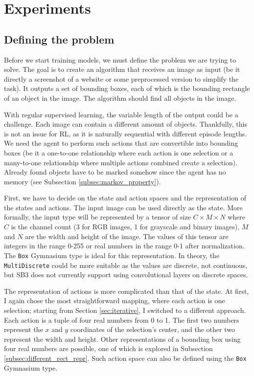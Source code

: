 \documentclass[
  digital,     %
  oneside,     %
  nosansbold,  %
  nocolorbold, %
  lof,         %
  lot,         %
]{fithesis4}
\begin{document}
\chapter{Experiments}
\label{ch:experiments}

\section{Defining the problem}
\label{sec:problem_definition}

Before we start training models, we must define the problem we are trying to solve. The goal is to create an algorithm that receives an image as input (be it directly a screenshot of a website or some preprocessed version to simplify the task). It outputs a set of bounding boxes, each of which is the bounding rectangle of an object in the image. The algorithm should find all objects in the image.

With regular supervised learning, the variable length of the output could be a challenge. Each image can contain a different amount of objects. Thankfully, this is not an issue for RL, as it is naturally sequential with different episode lengths. We need the agent to perform such actions that are convertible into bounding boxes (be it a one-to-one relationship where each action is one selection or a many-to-one relationship where multiple actions combined create a selection). Already found objects have to be marked somehow since the agent has no memory (see Subsection \ref{subsec:markov_property}).

First, we have to decide on the state and action spaces and the representation of the states and actions. The input image can be used directly as the state. More formally, the input type will be represented by a tensor of size $C\times M \times N$ where $C$ is the channel count (3 for RGB images, 1 for grayscale and binary images), $M$ and $N$ are the width and height of the image. The values of this tensor are integers in the range 0-255 or real numbers in the range 0-1 after normalization. The \texttt{Box} Gymnasium type is ideal for this representation. In theory, the \texttt{MultiDiscrete} could be more suitable as the values are discrete, not continuous, but SB3 does not currently support using convolutional layers on discrete spaces.

The representation of actions is more complicated than that of the state. At first, I again chose the most straightforward mapping, where each action is one selection; starting from Section \ref{sec:iterative}, I switched to a different approach. Each action is a tuple of four real numbers from 0 to 1. The first two numbers represent the $x$ and $y$ coordinates of the selection's center, and the other two represent the width and height. Other representations of a bounding box using four real numbers are possible, one of which is explored in Subsection \ref{subsec:different_rect_repr}. Such action space can also be defined using the \texttt{Box} Gymnasium type.
\end{document}
